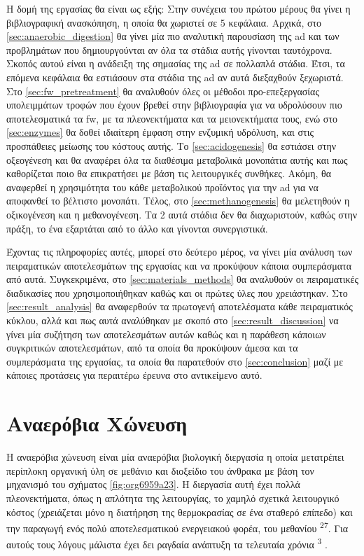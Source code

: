 \documentclass[11pt]{report}
\makeatletter
\newcommand{\citeprocitem}[2]{\hyper@linkstart{cite}{citeproc_bib_item_#1}#2\hyper@linkend}
\makeatother
\begin{document}
Η δομή της εργασίας θα είναι ως εξής: Στην συνέχεια του πρώτου μέρους θα γίνει η βιβλιογραφική ανασκόπηση, η οποία θα χωριστεί σε 5 κεφάλαια. Αρχικά, στο \autoref{sec:anaerobic_digestion} θα γίνει μία πιο αναλυτική παρουσίαση της \acrshort{ad} και των προβλημάτων που δημιουργούνται αν όλα τα στάδια αυτής γίνονται ταυτόχρονα. Σκοπός αυτού είναι η ανάδειξη της σημασίας της \acrshort{ad} σε πολλαπλά στάδια. Έτσι, τα επόμενα κεφάλαια θα εστιάσουν στα στάδια της \acrshort{ad} αν αυτά διεξαχθούν ξεχωριστά. Στο \autoref{sec:fw_pretreatment} θα αναλυθούν όλες οι μέθοδοι προ-επεξεργασίας υπολειμμάτων τροφών που έχουν βρεθεί στην βιβλιογραφία για να υδρολύσουν πιο αποτελεσματικά τα \acrshort{fw}, με τα πλεονεκτήματα και τα μειονεκτήματα τους, ενώ στο \autoref{sec:enzymes} θα δοθεί ιδιαίτερη έμφαση στην ενζυμική υδρόλυση, και στις προσπάθειες μείωσης του κόστους αυτής. Το \autoref{sec:acidogenesis} θα εστιάσει στην οξεογένεση και θα αναφέρει όλα τα διαθέσιμα μεταβολικά μονοπάτια αυτής και πως καθορίζεται ποιο θα επικρατήσει με βάση τις λειτουργικές συνθήκες. Ακόμη, θα αναφερθεί η χρησιμότητα του κάθε μεταβολικού προϊόντος για την \acrshort{ad} για να αποφανθεί το βέλτιστο μονοπάτι. Τέλος, στο \autoref{sec:methanogenesis} θα μελετηθούν η οξικογένεση και η μεθανογένεση. Τα 2 αυτά στάδια δεν θα διαχωριστούν, καθώς στην πράξη, το ένα εξαρτάται από το άλλο και γίνονται συνεργιστικά.

Έχοντας τις πληροφορίες αυτές, μπορεί στο δεύτερο μέρος, να γίνει μία ανάλυση των πειραματικών αποτελεσμάτων της εργασίας και να προκύψουν κάποια συμπεράσματα από αυτά. Συγκεκριμένα, στο \autoref{sec:materials_methods} θα αναλυθούν οι πειραματικές διαδικασίες που χρησιμοποιήθηκαν καθώς και οι πρώτες ύλες που χρειάστηκαν. Στο \autoref{sec:result_analysis} θα αναφερθούν τα πρωτογενή αποτελέσματα κάθε πειραματικός κύκλου, αλλά και πως αυτά αναλύθηκαν με σκοπό στο \autoref{sec:result_discussion} να γίνει μία συζήτηση των αποτελεσμάτων αυτών καθώς και η παράθεση κάποιων συγκριτικών αποτελεσμάτων, από τα οποία θα προκύψουν άμεσα και τα συμπεράσματα της εργασίας, τα οποία θα παρατεθούν στο \autoref{sec:conclusion} μαζί με κάποιες προτάσεις για περαιτέρω έρευνα στο αντικείμενο αυτό.

\chapter{Αναερόβια Χώνευση}
\label{sec:orgc4a3c4b}
\label{sec:anaerobic_digestion}

Η αναερόβια χώνευση είναι μία αναερόβια βιολογική διεργασία η οποία μετατρέπει περίπλοκη οργανική ύλη σε μεθάνιο και διοξείδιο του άνθρακα με βάση τον μηχανισμό του σχήματος \ref{fig:org6959a23}. Η διεργασία αυτή έχει πολλά πλεονεκτήματα, όπως η απλότητα της λειτουργίας, το χαμηλό σχετικά λειτουργικό κόστος (χρειάζεται μόνο η διατήρηση της θερμοκρασίας σε ένα σταθερό επίπεδο) και την παραγωγή ενός πολύ αποτελεσματικού ενεργειακού φορέα, του μεθανίου \textsuperscript{\citeprocitem{27}{27}}. Για αυτούς τους λόγους μάλιστα έχει δει ραγδαία ανάπτυξη τα τελευταία χρόνια \textsuperscript{\citeprocitem{3}{3}} .
\end{document}
